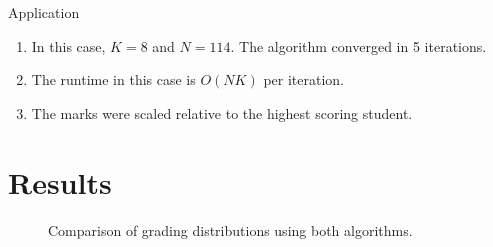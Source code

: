 \documentclass{beamer}
\providecommand{\brak}[1]{\ensuremath{\left(#1\right)}}
\theoremstyle{remark}
\begin{document}
\begin{frame}{Application}
    \pause
    \begin{enumerate}
        \item In this case, $K = 8$ and $N = 114$. The algorithm converged in 5 iterations.
        \pause
        \item The runtime in this case is $O\brak{NK}$ per iteration.
        \pause
        \item The marks were scaled relative to the highest scoring student.    
    \end{enumerate}
\end{frame}

\section{Results}
\begin{frame}
    \pause
    \begin{figure}
        \centering
        \qquad
        \caption{Comparison of grading distributions using both algorithms.}
    \end{figure}
\end{frame}
\end{document}
